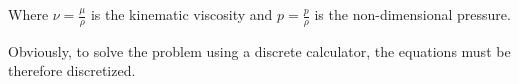 Where $\nu = \frac{\mu}{\rho}$ is the kinematic viscosity and $p = \frac{p}{\rho}$ is the non-dimensional pressure.

Obviously, to solve the problem using a discrete calculator, the equations must be therefore discretized.




% 
% 
% 
% 

